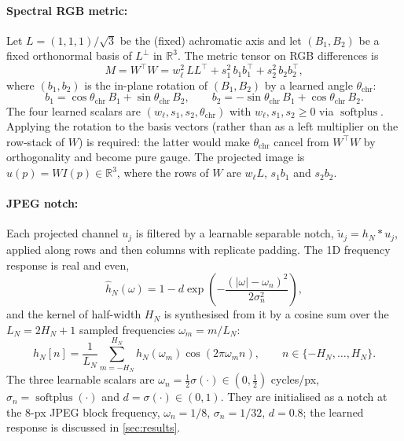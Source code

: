 \documentclass[11pt,a4paper]{article}
\newcommand{\R}{\mathbb{R}}
\newcommand{\abs}[1]{\left\lvert#1\right\rvert}
\newcommand{\softplus}{\operatorname{softplus}}
\begin{document}
\paragraph{Spectral RGB metric:}
Let $L = (1,1,1)/\sqrt{3}$ be the (fixed) achromatic axis and let $(B_1, B_2)$ be a fixed orthonormal basis of $L^{\perp}$ in $\R^3$. The metric tensor on RGB differences is
\begin{equation}\label{eq:metric}
  M = W^\top W = w_\ell^2\, L L^\top + s_1^2\, b_1 b_1^\top + s_2^2\, b_2 b_2^\top,
\end{equation}
where $(b_1, b_2)$ is the in-plane rotation of $(B_1, B_2)$ by a learned angle $\theta_{\mathrm{chr}}$:
\begin{equation}
  b_1 = \cos\theta_{\mathrm{chr}}\, B_1 + \sin\theta_{\mathrm{chr}}\, B_2,
  \qquad
  b_2 = -\sin\theta_{\mathrm{chr}}\, B_1 + \cos\theta_{\mathrm{chr}}\, B_2.
\end{equation}
The four learned scalars are $(w_\ell, s_1, s_2, \theta_{\mathrm{chr}})$ with $w_\ell, s_1, s_2 \geq 0$ via $\softplus$. Applying the rotation to the basis vectors (rather than as a left multiplier on the row-stack of $W$) is required: the latter would make $\theta_{\mathrm{chr}}$ cancel from $W^\top W$ by orthogonality and become pure gauge. The projected image is $u(p) = W I(p) \in \R^3$, where the rows of $W$ are $w_\ell L$, $s_1 b_1$ and $s_2 b_2$.

\paragraph{JPEG notch:}
Each projected channel $u_j$ is filtered by a learnable separable notch, $\tilde u_j = h_N * u_j$, applied along rows and then columns with replicate padding. The 1D frequency response is real and even,
\begin{equation}\label{eq:notch}
  \hat h_N(\omega) = 1 - d \exp\!\left(-\frac{(\abs{\omega} - \omega_n)^2}{2\sigma_n^2}\right),
\end{equation}
and the kernel of half-width $H_N$ is synthesised from it by a cosine sum over the $L_N = 2H_N + 1$ sampled frequencies $\omega_m = m/L_N$:
\begin{equation}\label{eq:notch-kernel}
  h_N[n] = \frac{1}{L_N}\sum_{m=-H_N}^{H_N} \hat h_N(\omega_m)\cos(2\pi\omega_m n),
  \qquad n \in \{-H_N, \dots, H_N\}.
\end{equation}
The three learnable scalars are $\omega_n = \tfrac{1}{2}\sigma(\cdot) \in (0, \tfrac{1}{2})$ cycles/px, $\sigma_n = \softplus(\cdot)$ and $d = \sigma(\cdot) \in (0, 1)$. They are initialised as a notch at the 8-px JPEG block frequency, $\omega_n = 1/8$, $\sigma_n = 1/32$, $d = 0.8$; the learned response is discussed in \cref{sec:results}.
\end{document}
